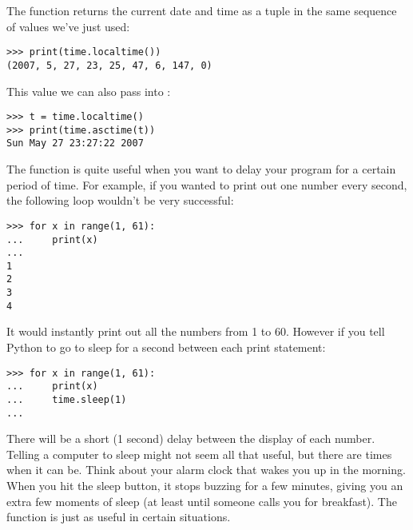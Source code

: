 \noindent
The function  returns the current date and time as a tuple in the same sequence of values we've just used:

\begin{listing}
\begin{verbatim}
>>> print(time.localtime())
(2007, 5, 27, 23, 25, 47, 6, 147, 0)
\end{verbatim}
\end{listing}

\noindent
This value we can also pass into :

\begin{listing}
\begin{verbatim}
>>> t = time.localtime()
>>> print(time.asctime(t))
Sun May 27 23:27:22 2007
\end{verbatim}
\end{listing}

\noindent
The function  is quite useful when you want to delay your program for a certain period of time.  For example, if you wanted to print out one number every second, the following loop wouldn't be very successful:

\begin{listing}
\begin{verbatim}
>>> for x in range(1, 61):
...     print(x)
...
1
2
3
4
\end{verbatim}
\end{listing}

It would instantly print out all the numbers from 1 to 60. However if you tell Python to go to sleep for a second between each print statement:

\begin{listing}
\begin{verbatim}
>>> for x in range(1, 61):
...     print(x)
...     time.sleep(1)
...
\end{verbatim}
\end{listing}

\noindent
There will be a short (1 second) delay between the display of each number. Telling a computer to sleep might not seem all that useful, but there are times when it can be.  Think about your alarm clock that wakes you up in the morning.  When you hit the sleep button, it stops buzzing for a few minutes, giving you an extra few moments of sleep (at least until someone calls you for breakfast).  The  function is just as useful in certain situations.

